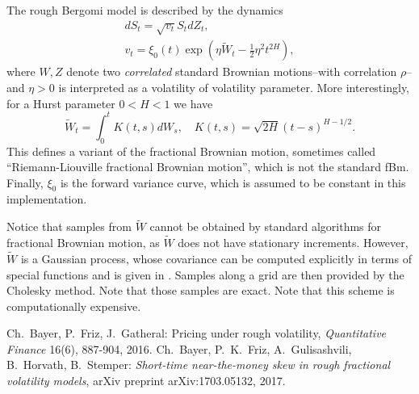 \documentclass[a4paper]{article}
\renewcommand{\tilde}[1]{\widetilde{#1}}
\begin{document}
The rough Bergomi model is described by the dynamics
\begin{gather*}
  dS_t = \sqrt{v_t} S_t dZ_t,\\
  v_t = \xi_0(t) \exp\left( \eta \tilde{W}_t - \frac{1}{2} \eta^2 t^{2H} \right),
\end{gather*}
where $W, Z$ denote two \emph{correlated} standard Brownian motions--with
correlation $\rho$--and $\eta > 0$ is interpreted as a volatility of volatility parameter. More
interestingly, for a Hurst parameter $0 < H < 1$ we have
\begin{equation*}
  \tilde{W}_t = \int_0^t K(t,s) dW_s, \quad K(t,s) = \sqrt{2H} (t-s)^{H - 1/2}.
\end{equation*}
This defines a variant of the fractional Brownian motion, sometimes called
``Riemann-Liouville fractional Brownian motion'', which is not the standard
fBm. Finally, $\xi_0$ is the forward variance curve, which is assumed to be
constant in this implementation.

Notice that samples from $\tilde{W}$ cannot be obtained by standard algorithms
for fractional Brownian motion, as $\tilde{W}$ does not have stationary increments.
However, $\tilde{W}$ is a Gaussian process, whose covariance can be computed
explicitly in terms of special functions and is given in \cite{B+}. Samples
along a grid are then provided by the Cholesky method. Note that those samples
are exact. Note that this scheme is computationally expensive.

\begin{thebibliography}{9}
 Ch.~Bayer, P.~Friz, J.~Gatheral: Pricing under rough
  volatility, \emph{Quantitative Finance} 16(6), 887-904, 2016.
 Ch.~Bayer, P.~K.~Friz, A.~Gulisashvili, B.~Horvath,
  B.~Stemper: \emph{Short-time near-the-money skew in rough fractional
    volatility models}, arXiv preprint arXiv:1703.05132, 2017.
\end{thebibliography}
\end{document}
